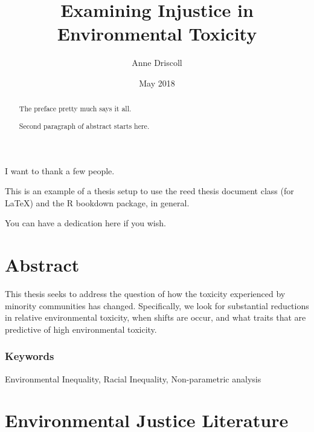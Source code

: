 \documentclass[12pt,twoside]{dukestatscithesis}
\title{Examining Injustice in Environmental Toxicity}
\author{Anne Driscoll}
\date{May 2018}
\theoremstyle{definition}
\theoremstyle{definition}
\theoremstyle{definition}
\theoremstyle{remark}
\begin{document}
  \maketitle

\frontmatter %
\pagestyle{empty} %
  \begin{acknowledgements}
    I want to thank a few people.
  \end{acknowledgements}
  \begin{preface}
    This is an example of a thesis setup to use the reed thesis document
    class (for LaTeX) and the R bookdown package, in general.
  \end{preface}
  \hypersetup{linkcolor=black}
  \setcounter{tocdepth}{2}
  \tableofcontents

  \listoftables

  \listoffigures
  \begin{abstract}
    The preface pretty much says it all. \par
    
    Second paragraph of abstract starts here.
  \end{abstract}
  \begin{dedication}
    You can have a dedication here if you wish.
  \end{dedication}
\mainmatter %
\pagestyle{fancyplain} %

\chapter*{Abstract}\label{abstract}

This thesis seeks to address the question of how the toxicity
experienced by minority communities has changed. Specifically, we look
for substantial reductions in relative environmental toxicity, when
shifts are occur, and what traits that are predictive of high
environmental toxicity.

\subsection*{Keywords}\label{keywords}

Environmental Inequality, Racial Inequality, Non-parametric analysis

\chapter{Environmental Justice Literature}\label{env_justice}
\end{document}
